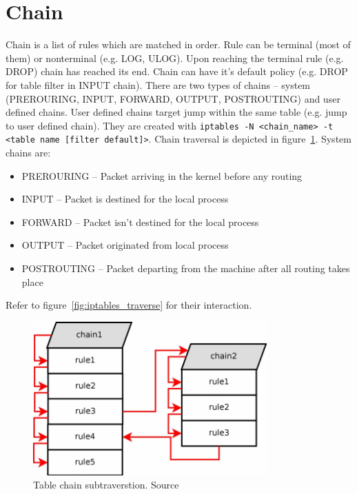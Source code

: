 \documentclass[times, utf8, seminar, english]{fer}
\begin{document}
\section{Chain}
\label{sec:chain}
    Chain is a list of rules which are matched in order. Rule can be terminal (most of them) or nonterminal (e.g. LOG,  ULOG). Upon reaching the terminal rule (e.g. DROP) chain has reached its end. Chain can have it's default policy (e.g. DROP for table filter in INPUT chain).
    There are two types of chains -- system (PREROURING, INPUT, FORWARD, OUTPUT, POSTROUTING) and user defined chains.
    User defined chains target jump within the same table (e.g. jump to user defined chain).
    They are created with \verb|iptables -N <chain_name> -t <table name [filter default]>|.
    Chain traversal is depicted in figure~\ref{fig:iptables_subtraverse}. System chains are:

    \begin{itemize}
        \item PREROURING -- Packet arriving in the kernel before any routing
        \item INPUT -- Packet is destined for the local process
        \item FORWARD -- Packet isn't destined for the local process
        \item OUTPUT -- Packet originated from local process
        \item POSTROUTING -- Packet departing from the machine after all routing takes place
    \end{itemize}
    Refer to figure~\ref{fig:iptables_traverse} for their interaction.

    \begin{figure}
        \centering
        \includegraphics[width=0.8\textwidth]{table_subtraverse}
        \caption{Table chain subtraverstion. Source~\cite{Iptables99:online}}
        \label{fig:iptables_subtraverse}
    \end{figure}
\end{document}
